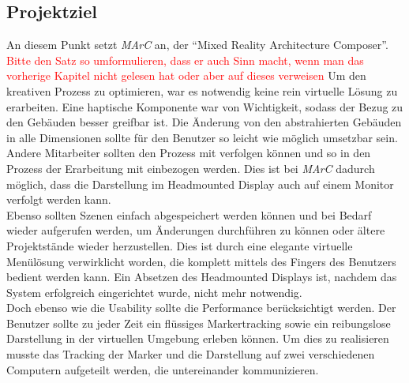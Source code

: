 \subsection{Projektziel}\label{sec:Projektziel}
An diesem Punkt setzt \textit{MArC} an, der "`Mixed Reality Architecture Composer"'. \textcolor{red}{Bitte den Satz so umformulieren, dass er auch Sinn macht, wenn man das vorherige Kapitel nicht gelesen hat oder aber auf dieses verweisen}
Um den kreativen Prozess zu optimieren, war es notwendig keine rein virtuelle Lösung zu erarbeiten. Eine haptische Komponente war von Wichtigkeit, sodass der Bezug zu den Gebäuden besser greifbar ist. Die Änderung von den abstrahierten Gebäuden in alle Dimensionen sollte für den Benutzer so leicht wie möglich umsetzbar sein. Andere Mitarbeiter sollten den Prozess mit verfolgen können und so in den Prozess der Erarbeitung mit einbezogen werden. Dies ist bei \textit{MArC} dadurch möglich, dass die Darstellung im Headmounted Display auch auf einem Monitor verfolgt werden kann. \\
Ebenso sollten Szenen einfach abgespeichert werden können und bei Bedarf wieder aufgerufen werden, um Änderungen durchführen zu können oder ältere Projektstände wieder herzustellen. Dies ist durch eine elegante virtuelle Menülösung verwirklicht worden, die komplett mittels des Fingers des Benutzers bedient werden kann. Ein Absetzen des Headmounted Displays ist, nachdem das System erfolgreich eingerichtet wurde, nicht mehr notwendig.\\
Doch ebenso wie die Usability sollte die Performance berücksichtigt werden. Der Benutzer sollte zu jeder Zeit ein flüssiges Markertracking sowie ein reibungslose Darstellung in der virtuellen Umgebung erleben können. Um dies zu realisieren musste das Tracking der Marker und die Darstellung auf zwei verschiedenen Computern aufgeteilt werden, die untereinander kommunizieren.\\























